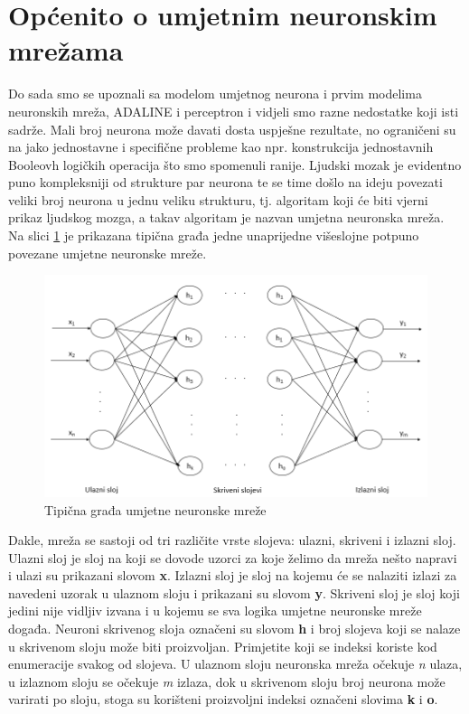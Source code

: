 \documentclass[times, utf8, zavrsni]{fer}
\begin{document}
\section{Općenito o umjetnim neuronskim mrežama}
Do sada smo se upoznali sa modelom umjetnog neurona i prvim modelima neuronskih mreža, ADALINE i perceptron i vidjeli smo razne nedostatke koji isti sadrže. Mali broj neurona može davati dosta uspješne rezultate, no ograničeni su na jako jednostavne i  specifične probleme kao npr. konstrukcija jednostavnih Booleovh logičkih operacija što smo spomenuli ranije. Ljudski mozak je evidentno puno kompleksniji od strukture par neurona te se time došlo na ideju povezati veliki broj neurona u jednu veliku strukturu, tj. algoritam koji će biti vjerni prikaz ljudskog mozga, a takav algoritam je nazvan umjetna neuronska mreža. Na slici \ref{fig:ann} je prikazana tipična građa jedne unaprijedne višeslojne potpuno povezane umjetne neuronske mreže.

\begin{figure}[H]
    \centering
    \includegraphics[scale=0.6]{img/ann.png}
    \caption[Caption for LOF]{Tipična građa umjetne neuronske mreže\footnotemark}
    \label{fig:ann}
\end{figure}

Dakle, mreža se sastoji od tri različite vrste slojeva: ulazni, skriveni i izlazni sloj. Ulazni sloj je sloj na koji se dovode uzorci za koje želimo da mreža nešto napravi i ulazi su prikazani slovom \textbf{x}. Izlazni sloj je sloj na kojemu će se nalaziti izlazi za navedeni uzorak u ulaznom sloju i prikazani su slovom \textbf{y}. Skriveni sloj je sloj koji jedini nije vidljiv izvana i u kojemu se sva logika umjetne neuronske mreže događa. Neuroni skrivenog sloja označeni su slovom \textbf{h} i broj slojeva koji se nalaze u skrivenom sloju može biti proizvoljan. Primjetite koji se indeksi koriste kod enumeracije svakog od slojeva. U ulaznom sloju neuronska mreža očekuje \textit{n} ulaza, u izlaznom sloju se očekuje \textit{m} izlaza, dok u skrivenom sloju broj neurona može varirati po sloju, stoga su korišteni proizvoljni indeksi označeni slovima \textbf{k} i \textbf{o}.
\end{document}
